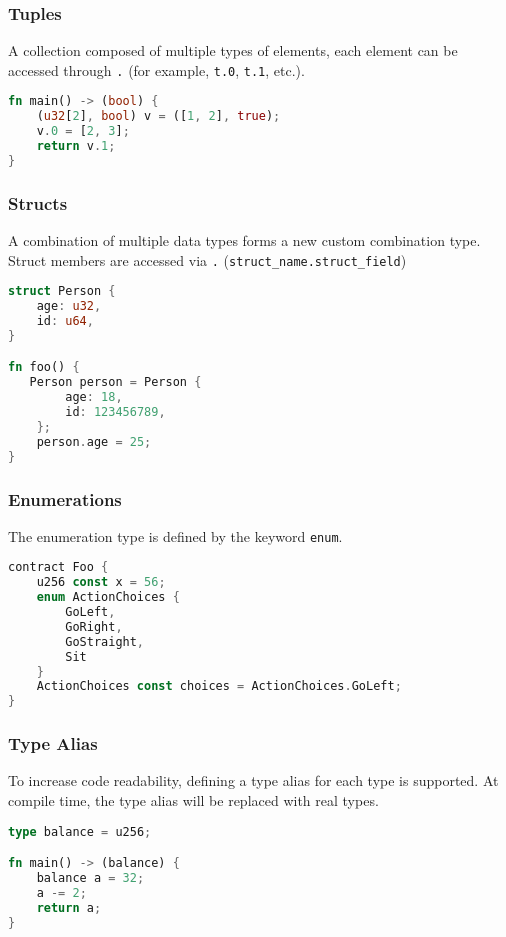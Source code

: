 \subsubsection*{Tuples}

A collection composed of multiple types of elements, each element can be accessed through \texttt{.} (for example, \texttt{t.0}, \texttt{t.1}, etc.).

\begin{lstlisting}[language=rust]
fn main() -> (bool) {
    (u32[2], bool) v = ([1, 2], true);
    v.0 = [2, 3];
    return v.1;
}
\end{lstlisting}

\subsubsection*{Structs}

A combination of multiple data types forms a new custom combination type. Struct members are accessed via \texttt{.} (\texttt{struct\_name.struct\_field})

\begin{lstlisting}[language=rust]
struct Person {
    age: u32,
    id: u64,
}

fn foo() {
   Person person = Person {
        age: 18,
        id: 123456789,
    };
    person.age = 25;
}
\end{lstlisting}

\subsubsection*{Enumerations}

The enumeration type is defined by the keyword \texttt{enum}.

\begin{lstlisting}[language=rust]
contract Foo {
    u256 const x = 56;
    enum ActionChoices {
        GoLeft,
        GoRight,
        GoStraight,
        Sit
    }
    ActionChoices const choices = ActionChoices.GoLeft;
}
\end{lstlisting}


\subsubsection*{Type Alias}

To increase code readability, defining a type alias for each type is supported. At compile time, the type alias will be replaced with real types.

\begin{lstlisting}[language=rust]
type balance = u256;

fn main() -> (balance) {
    balance a = 32;
    a -= 2;
    return a;
}
\end{lstlisting}

